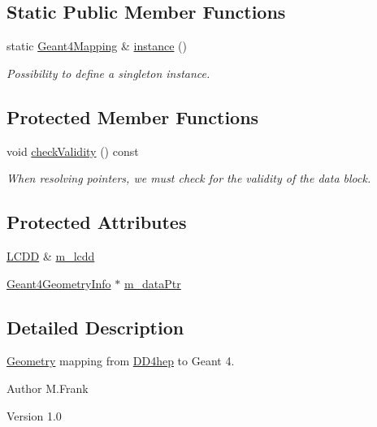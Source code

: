 \subsection*{Static Public Member Functions}
\begin{DoxyCompactItemize}
\item 
static \hyperlink{class_d_d4hep_1_1_simulation_1_1_geant4_mapping}{Geant4Mapping} \& \hyperlink{class_d_d4hep_1_1_simulation_1_1_geant4_mapping_affbc609db47e67ea60b84e61a41c00b6}{instance} ()
\begin{DoxyCompactList}\small\item\em Possibility to define a singleton instance. \item\end{DoxyCompactList}\end{DoxyCompactItemize}
\subsection*{Protected Member Functions}
\begin{DoxyCompactItemize}
\item 
void \hyperlink{class_d_d4hep_1_1_simulation_1_1_geant4_mapping_ae2b4f0f0b1e035eb7ca8b220ff5c815a}{checkValidity} () const 
\begin{DoxyCompactList}\small\item\em When resolving pointers, we must check for the validity of the data block. \item\end{DoxyCompactList}\end{DoxyCompactItemize}
\subsection*{Protected Attributes}
\begin{DoxyCompactItemize}
\item 
\hyperlink{class_d_d4hep_1_1_geometry_1_1_l_c_d_d}{LCDD} \& \hyperlink{class_d_d4hep_1_1_simulation_1_1_geant4_mapping_a4c514a5fa835d901c01cf5a860960958}{m\_\-lcdd}
\item 
\hyperlink{class_d_d4hep_1_1_simulation_1_1_geant4_geometry_info}{Geant4GeometryInfo} $\ast$ \hyperlink{class_d_d4hep_1_1_simulation_1_1_geant4_mapping_a93f0104487f0ff971b9b72777e287c75}{m\_\-dataPtr}
\end{DoxyCompactItemize}


\subsection{Detailed Description}
\hyperlink{namespace_d_d4hep_1_1_geometry}{Geometry} mapping from \hyperlink{namespace_d_d4hep}{DD4hep} to Geant 4. \begin{DoxyAuthor}{Author}
M.Frank 
\end{DoxyAuthor}
\begin{DoxyVersion}{Version}
1.0 
\end{DoxyVersion}


